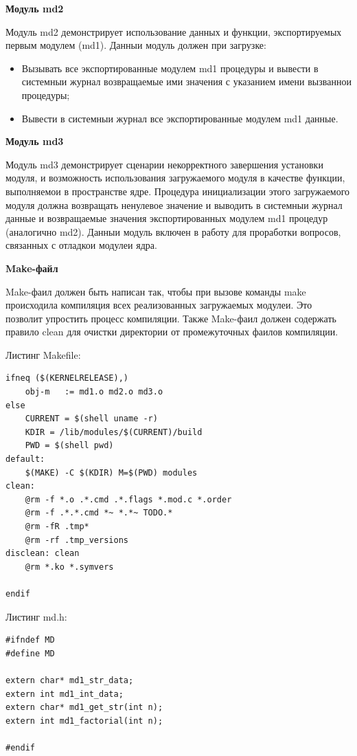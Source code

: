 \textbf{Модуль md2}

Модуль md2 демонстрирует использование данных и функции, экспортируемых первым модулем (md1). Данныи модуль должен при загрузке:
\begin{itemize}
    \item Вызывать все экспортированные модулем md1 процедуры и вывести в системныи журнал возвращаемые ими значения с указанием имени вызваннои процедуры;
    \item Вывести в системныи журнал все экспортированные модулем md1 данные.
\end{itemize}

\textbf{Модуль md3}

Модуль md3 демонстрирует сценарии некорректного завершения установки модуля,
и возможность использования загружаемого модуля в качестве функции, выполняемои
в пространстве ядре.
Процедура инициализации этого загружаемого модуля должна возвращать ненулевое значение и выводить в системныи журнал данные и возвращаемые значения экспортированных модулем md1 процедур (аналогично md2).
Данныи модуль включен в работу для проработки вопросов, связанных с отладкои
модулеи ядра.

\textbf{Make-файл}

Make-фаил должен быть написан так, чтобы при вызове команды make происходила компиляция всех реализованных загружаемых модулеи. Это позволит упростить
процесс компиляции. Также Make-фаил должен содержать правило clean для очистки
директории от промежуточных фаилов компиляции.

Листинг Makefile:
\lstset{language=c}
\begin{lstlisting}[caption=Текст header файла md.h]
ifneq ($(KERNELRELEASE),)
	obj-m   := md1.o md2.o md3.o
else
	CURRENT = $(shell uname -r)
	KDIR = /lib/modules/$(CURRENT)/build 
	PWD = $(shell pwd)
default: 
	$(MAKE) -C $(KDIR) M=$(PWD) modules 
clean: 
	@rm -f *.o .*.cmd .*.flags *.mod.c *.order 
	@rm -f .*.*.cmd *~ *.*~ TODO.* 
	@rm -fR .tmp* 
	@rm -rf .tmp_versions 
disclean: clean 
	@rm *.ko *.symvers 

endif
\end{lstlisting}

Листинг md.h:
\lstset{language=c}
\begin{lstlisting}[caption=Текст header файла md.h]
#ifndef MD
#define MD

extern char* md1_str_data;
extern int md1_int_data;
extern char* md1_get_str(int n);
extern int md1_factorial(int n);

#endif
\end{lstlisting}

